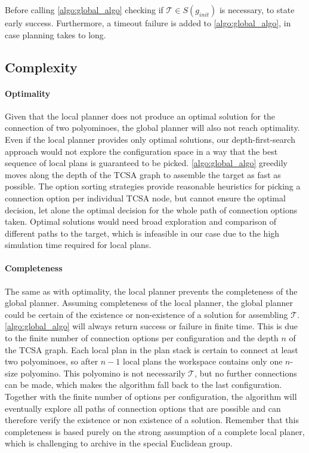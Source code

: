 Before calling \autoref{algo:global_algo} checking if $\mathcal{T} \in S(g_\textit{init})$ is necessary, to state early success.
Furthermore, a timeout failure is added to \autoref{algo:global_algo}, in case planning takes to long.
 
\subsection{Complexity}
\label{sec:global_complex}

\paragraph{Optimality}

Given that the local planner does not produce an optimal solution for the connection of two polyominoes, the global planner will also not reach optimality.
Even if the local planner provides only optimal solutions, our depth-first-search approach would not explore the configuration space in a way that the best sequence of local plans is guaranteed to be picked.
\autoref{algo:global_algo} greedily moves along the depth of the TCSA graph to assemble the target as fast as possible.
The option sorting strategies provide reasonable heuristics for picking a connection option per individual TCSA node, but cannot ensure the optimal decision, let alone the optimal decision for the whole path of connection options taken.
Optimal solutions would need broad exploration and comparison of different paths to the target, which is infeasible in our case due to the high simulation time required for local plans.

\paragraph{Completeness}

The same as with optimality, the local planner prevents the completeness of the global planner.
Assuming completeness of the local planner, the global planner could be certain of the existence or non-existence of a solution for assembling $\mathcal{T}$.
\autoref{algo:global_algo} will always return success or failure in finite time.
This is due to the finite number of connection options per configuration and the depth $n$ of the TCSA graph.
Each local plan in the plan stack is certain to connect at least two polyominoes, so after $n-1$ local plans the workspace contains only one $n$-size polyomino.
This polyomino is not necessarily $\mathcal{T}$, but no further connections can be made, which makes the algorithm fall back to the last configuration.
Together with the finite number of options per configuration, the algorithm will eventually explore all paths of connection options that are possible and can therefore verify the existence or non existence of a solution.
Remember that this completeness is based purely on the strong assumption of a complete local planer, which is challenging to archive in the special Euclidean group.

